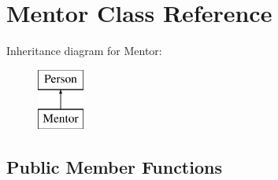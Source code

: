 \hypertarget{class_mentor}{}\section{Mentor Class Reference}
\label{class_mentor}
Inheritance diagram for Mentor\+:\begin{figure}[H]
\begin{center}
\leavevmode
\includegraphics[height=2.000000cm]{class_mentor}
\end{center}
\end{figure}
\subsection*{Public Member Functions}
